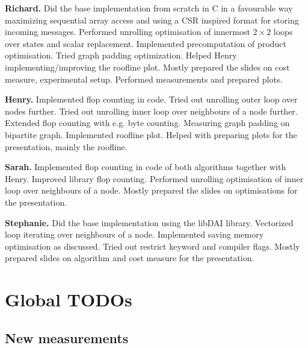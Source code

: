 \documentclass[letterpaper]{article}
\newcommand{\mypar}[1]{{\bf #1.}}
\begin{document}

\mypar{Richard} Did the base implementation from scratch in C in a favourable way maximizing sequential array access and using a CSR inspired format for storing incoming messages. Performed unrolling optimisation of innermost $2\times2$ loops over states and scalar replacement. Implemented precomputation of product optimisation. Tried graph padding optimization. Helped Henry implementing/improving the roofline plot. Mostly prepared the slides on cost measure, experimental setup. Performed measurements and prepared plots.

\mypar{Henry} Implemented flop counting in code. Tried out unrolling outer loop over nodes further. Tried out unrolling inner loop over neighbours of a node further. Extended flop counting with e.g. byte counting. Measuring graph padding on bipartite graph. Implemented roofline plot. Helped with preparing plots for the presentation, mainly the roofline.

\mypar{Sarah} Implemented flop counting in code of both algorithms together with Henry. Improved library flop counting. Performed unrolling optimisation of inner loop over neighbours of a node. Mostly prepared the slides on optimisations for the presentation.

\mypar{Stephanie} Did the base implementation using the libDAI library. Vectorized loop iterating over neighbours of a node. Implemented saving memory optimisation as discussed. Tried out restrict keyword and compiler flags. Mostly prepared slides on algorithm and cost measure for the presentation.


\section{Global TODOs}


\subsection{New measurements}

\end{document}
